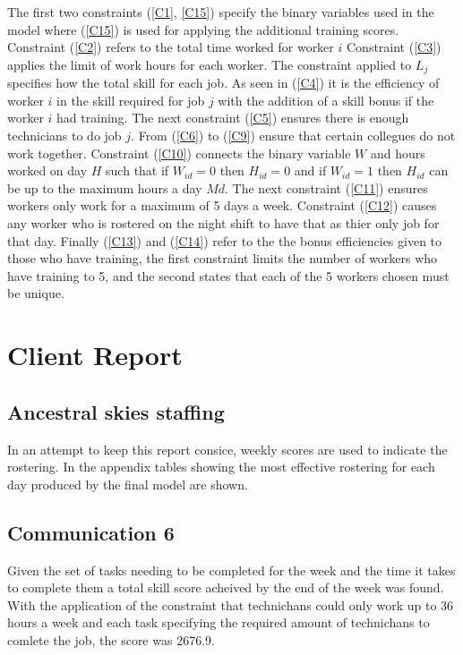 \documentclass{article}
\begin{document}
	The first two constraints (\ref{C1}, \ref{C15}) specify the binary variables used in the model where (\ref{C15})
	is used for applying the additional training scores. Constraint (\ref{C2}) refers to the total time worked for worker $i$
	Constraint (\ref{C3}) applies the limit of work hours for each worker. The constraint applied to $L_j$ specifies how the
	total skill for each job. As seen in (\ref{C4}) it is the efficiency of worker $i$ in the skill required for job $j$
	with the addition of a skill bonus if the worker $i$ had training.
	The next constraint (\ref{C5}) ensures there is enough technicians to do job $j$.
	From (\ref{C6}) to (\ref{C9}) ensure that certain collegues do not work together.
	Constraint (\ref{C10}) connects the binary variable $W$ and hours worked on day $H$ such that if $W_{id} = 0$ then $H_{id} = 0$
	and if $W_{id} = 1$ then $H_{id}$ can be up to the maximum hours a day $Md$.
	The next constraint (\ref{C11}) ensures workers only work for a maximum of 5 days a week.
	Constraint (\ref{C12}) causes any worker who is rostered on the night shift to have that as thier only job for that day.
	Finally (\ref{C13}) and (\ref{C14}) refer to the the bonus efficiencies given to those who have training, the first constraint 
	limits the number of workers who have training to 5, and the second states that each of the 5 workers chosen must be unique.
\newpage

\section*{Client Report}
\subsection*{Ancestral skies staffing}
In an attempt to keep this report consice, weekly scores are used to indicate the rostering.
In the appendix tables showing the most effective rostering for each day produced by the final model are shown. 

\subsection*{Communication 6}
Given the set of tasks needing to be completed for the week and the time it takes to complete them a 
total skill score acheived by the end of the week was found.
With the application of the constraint that technichans could only work up to 36 hours a week and each task
specifying the required amount of technichans to comlete the job, the score was 2676.9.
\end{document}
